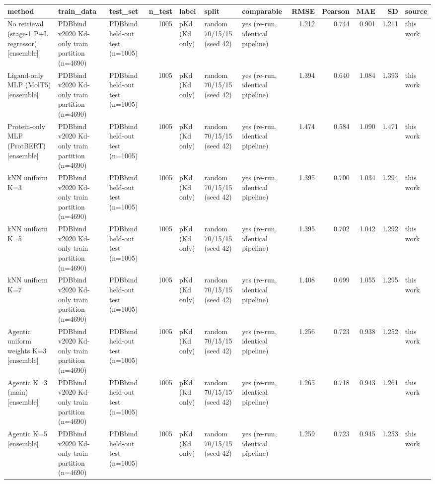 \begin{tabular}{lllrlllrrrrl}
\toprule
method & train_data & test_set & n_test & label & split & comparable & RMSE & Pearson & MAE & SD & source \\
\midrule
No retrieval (stage-1 P+L regressor) [ensemble] & PDBbind v2020 Kd-only train partition (n=4690) & PDBbind held-out test (n=1005) & 1005 & pKd (Kd only) & random 70/15/15 (seed 42) & yes (re-run, identical pipeline) & 1.212 & 0.744 & 0.901 & 1.211 & this work \\
Ligand-only MLP (MolT5) [ensemble] & PDBbind v2020 Kd-only train partition (n=4690) & PDBbind held-out test (n=1005) & 1005 & pKd (Kd only) & random 70/15/15 (seed 42) & yes (re-run, identical pipeline) & 1.394 & 0.640 & 1.084 & 1.393 & this work \\
Protein-only MLP (ProtBERT) [ensemble] & PDBbind v2020 Kd-only train partition (n=4690) & PDBbind held-out test (n=1005) & 1005 & pKd (Kd only) & random 70/15/15 (seed 42) & yes (re-run, identical pipeline) & 1.474 & 0.584 & 1.090 & 1.471 & this work \\
kNN uniform K=3 & PDBbind v2020 Kd-only train partition (n=4690) & PDBbind held-out test (n=1005) & 1005 & pKd (Kd only) & random 70/15/15 (seed 42) & yes (re-run, identical pipeline) & 1.395 & 0.700 & 1.034 & 1.294 & this work \\
kNN uniform K=5 & PDBbind v2020 Kd-only train partition (n=4690) & PDBbind held-out test (n=1005) & 1005 & pKd (Kd only) & random 70/15/15 (seed 42) & yes (re-run, identical pipeline) & 1.395 & 0.702 & 1.042 & 1.292 & this work \\
kNN uniform K=7 & PDBbind v2020 Kd-only train partition (n=4690) & PDBbind held-out test (n=1005) & 1005 & pKd (Kd only) & random 70/15/15 (seed 42) & yes (re-run, identical pipeline) & 1.408 & 0.699 & 1.055 & 1.295 & this work \\
Agentic uniform weights K=3 [ensemble] & PDBbind v2020 Kd-only train partition (n=4690) & PDBbind held-out test (n=1005) & 1005 & pKd (Kd only) & random 70/15/15 (seed 42) & yes (re-run, identical pipeline) & 1.256 & 0.723 & 0.938 & 1.252 & this work \\
Agentic K=3 (main) [ensemble] & PDBbind v2020 Kd-only train partition (n=4690) & PDBbind held-out test (n=1005) & 1005 & pKd (Kd only) & random 70/15/15 (seed 42) & yes (re-run, identical pipeline) & 1.265 & 0.718 & 0.943 & 1.261 & this work \\
Agentic K=5 [ensemble] & PDBbind v2020 Kd-only train partition (n=4690) & PDBbind held-out test (n=1005) & 1005 & pKd (Kd only) & random 70/15/15 (seed 42) & yes (re-run, identical pipeline) & 1.259 & 0.723 & 0.945 & 1.253 & this work \\

\end{tabular}
